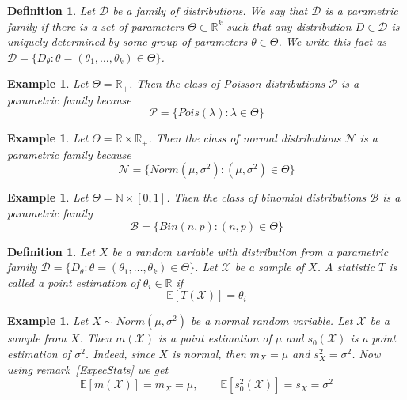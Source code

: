 \documentclass[12pt]{article}
\newtheorem{definition}[theorem]{Definition}
\newtheorem{example}[theorem]{Example}
\begin{document}
\begin{definition} Let $\mathcal{D}$ be a family of distributions. We say that
    $\mathcal{D}$ is a parametric family if there is a set of parameters
    $\Theta\subset\mathbb{R}^k$ such that any distribution $D\in\mathcal{D}$ is
    uniquely determined by some group of parameters $\theta\in\Theta$. We write
    this fact as
    $\mathcal{D}=\{D_\theta:\theta=(\theta_1,\ldots,\theta_k)\in\Theta \}$.
\end{definition}

\begin{example} Let $\Theta=\mathbb{R}_+$. Then the class of Poisson
    distributions $\mathcal{P}$ is a parametric family because
    $$
        \mathcal{P}=\{Pois(\lambda):\lambda\in\Theta \}
    $$
\end{example}

\begin{example} Let $\Theta=\mathbb{R}\times\mathbb{R}_+$. Then the class of
    normal distributions $\mathcal{N}$ is a parametric family because
    $$
        \mathcal{N}=\{Norm(\mu,\sigma^2): (\mu,\sigma^2)\in\Theta \}
    $$
\end{example}

\begin{example} Let $\Theta=\mathbb{N}\times[0,1]$. Then the class of binomial
    distributions $\mathcal{B}$ is a parametric family
    $$
        \mathcal{B}=\{Bin(n,p):(n,p)\in\Theta \}
    $$
\end{example}

\begin{definition} Let $X$ be a random variable with distribution from a
    parametric family
    $\mathcal{D}=\{D_\theta:\theta=(\theta_1,\ldots,\theta_k)\in\Theta \}$. Let
    $\mathscr{X}$ be a sample of $X$. A statistic $T$ is called a point
    estimation of $\theta_i\in\mathbb{R}$ if
    $$
        \mathbb{E}[T(\mathscr{X})]=\theta_i
    $$
\end{definition}

\begin{example} Let $X\sim Norm(\mu,\sigma^2)$ be a normal random variable. Let
    $\mathscr{X}$ be a sample from $X$. Then $m(\mathscr{X})$ is a point
    estimation of $\mu$ and $s_{0}(\mathscr{X})$ is a point estimation of
    $\sigma^2$. Indeed, since $X$ is normal, then $m_X=\mu$ and
    $s_X^2=\sigma^2$. Now using remark~\ref{ExpecStats} we get
    $$
        \mathbb{E}[m(\mathscr{X})]=m_X=\mu,
        \quad\quad
        \mathbb{E}[s_{0}^2(\mathscr{X})]=s_X=\sigma^2
    $$
\end{example}
\end{document}
